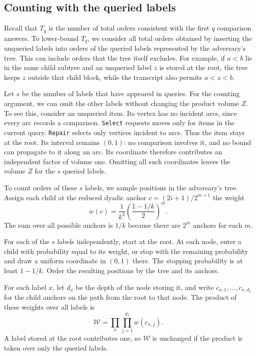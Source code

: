 \subsection{Counting with the queried labels}\label{sec:movement-volume}

Recall that $T_q$ is the number of total orders consistent with the first
$q$ comparison answers. To lower-bound $T_q$, we consider all total orders
obtained by inserting the unqueried labels into orders of the queried labels
represented by the adversary's tree. This can include orders that the
tree itself excludes. For example, if $a<b$ lie in the same child subtree
and an unqueried label $z$ is stored at the root, the tree keeps $z$
outside that child block, while the transcript also permits $a<z<b$.

Let $s$ be the number of labels that have appeared in queries.
For the counting argument, we can omit the other labels without changing
the product volume $Z$. To see this, consider an unqueried item. Its
vertex has no incident arcs, since every arc records a comparison.
\texttt{Select} requests moves only for items in the current query.
\texttt{Repair} selects only vertices incident to arcs. Thus the item
stays at the root. Its interval remains $(0,1)$: no comparison involves
it, and no bound can propagate to it along an arc. Its coordinate
therefore contributes an independent factor of volume one. Omitting all
such coordinates leaves the volume $Z$ for the $s$ queried labels.

To count orders of these $s$ labels, we sample positions in the
adversary's tree. Assign each child at the reduced dyadic anchor
$c=(2i+1)/2^{m+1}$ the weight
\begin{equation}\label{eq:child-weight}
w(c)=\frac1{k^2}\left(\frac{1-1/k}{2}\right)^m.
\end{equation}
The sum over all possible anchors is $1/k$ because there are $2^m$
anchors for each $m$.

For each of the $s$ labels independently, start at the root. At each
node, enter a child with probability equal to its weight, or stop with
the remaining probability and draw a uniform coordinate in $(0,1)$
there. The stopping probability is at least $1-1/k$. Order the resulting
positions by the tree and its anchors.

For each label $x$, let $d_x$ be the depth of the
node storing it, and write $c_{x,1},\ldots,c_{x,d_x}$ for the child
anchors on the path from the root to that node.
The product of these weights over all labels is
\begin{equation}\label{eq:path-weight-product}
\mathcal W=\prod_x\prod_{j=1}^{d_x}w(c_{x,j}).
\end{equation}
A label stored at the root contributes one, so $\mathcal W$ is unchanged
if the product is taken over only the queried labels.

